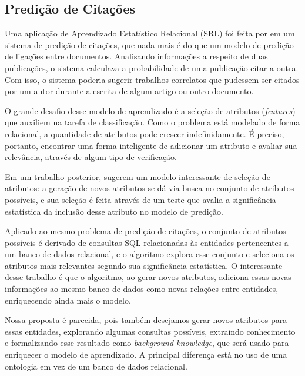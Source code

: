 \subsection{Predição de Citações}
\label{ssec:srl}

Uma aplicação de Aprendizado Estatístico Relacional (SRL) foi feita por \citet{Popescul2003} em um sistema de predição de citações, que nada mais é do que um modelo de predição de ligações entre documentos. Analisando informações a respeito de duas publicações, o sistema calculava a probabilidade de uma publicação citar a outra. Com isso, o sistema poderia sugerir trabalhos correlatos que pudessem ser citados por um autor durante a escrita de algum artigo ou outro documento.

O grande desafio desse modelo de aprendizado é a seleção de atributos (\textit{features}) que auxiliem na tarefa de classificação. Como o problema está modelado de forma relacional, a quantidade de atributos pode crescer indefinidamente. É preciso, portanto, encontrar uma forma inteligente de adicionar um atributo e avaliar sua relevância, através de algum tipo de verificação.

Em um trabalho posterior, \citet{Popescul2007} sugerem um modelo interessante de seleção de atributos: a geração de novos atributos se dá via busca no conjunto de atributos possíveis, e sua seleção é feita através de um teste que avalia a significância estatística da inclusão desse atributo no modelo de predição.

Aplicado ao mesmo problema de predição de citações, o conjunto de atributos possíveis é derivado de consultas SQL relacionadas às entidades pertencentes a um banco de dados relacional, e o algoritmo explora esse conjunto e seleciona os atributos mais relevantes segundo sua significância estatística. O interessante desse trabalho é que o algoritmo, ao gerar novos atributos, adiciona essas novas informações ao mesmo banco de dados como novas relações entre entidades, enriquecendo ainda mais o modelo.

Nossa proposta é parecida, pois também desejamos gerar novos atributos para essas entidades, explorando algumas consultas possíveis, extraindo conhecimento e formalizando esse resultado como \textit{background-knowledge}, que será usado para enriquecer o modelo de aprendizado.  A principal diferença está no uso de uma ontologia em vez de um banco de dados relacional.


